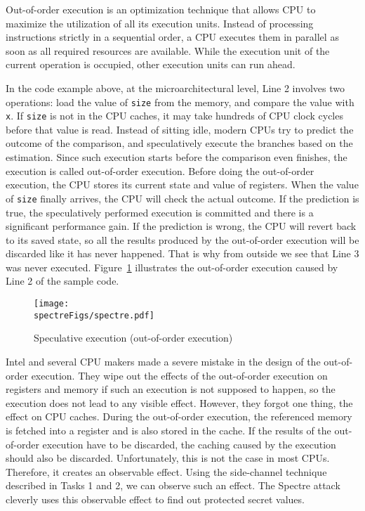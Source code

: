 Out-of-order execution is an optimization technique that allows CPU to maximize the utilization of
all its execution units. Instead of processing instructions
strictly in a sequential order, a CPU executes them in parallel
as soon as all required resources are available.
While the execution unit of the current operation is occupied, other
execution units can run ahead.

In the code example above, at the microarchitectural level, Line 2 involves
two operations: load the value of \texttt{size} from the memory, 
and compare the value with \texttt{x}. If \texttt{size} is not in the CPU
caches, it may take hundreds of CPU clock cycles before that value is read.
Instead of sitting idle, modern CPUs try to predict the outcome 
of the comparison, and speculatively execute the branches based on
the estimation. Since such execution starts before the comparison even finishes,
the execution is called out-of-order execution. 
Before doing the out-of-order execution,  
the CPU stores its current state and value of registers. 
When the value of \texttt{size} finally arrives, 
the CPU will check the actual outcome. If the prediction is true, the speculatively
performed execution is committed and there is a significant performance gain. If the prediction
is wrong, the CPU will revert back to its saved state, 
so all the results produced by the out-of-order execution will be discarded like
it has never happened.  That is why from outside we see that Line 3 was
never executed.
Figure~\ref{spectre:fig:spectre} illustrates the out-of-order execution
caused by Line 2 of the sample code.


\begin{figure}[htb]
\centering
\texttt{[image: \\spectreFigs/spectre.pdf]}
\caption{Speculative execution (out-of-order execution)}
\label{spectre:fig:spectre}
\end{figure}


Intel and several CPU makers made a severe mistake in the design of the out-of-order execution.
They wipe out the effects of the out-of-order execution on registers and memory
if such an execution is not supposed to happen, so the execution does not lead to
any visible effect. However, they forgot one thing, the effect on CPU caches.
During the out-of-order execution, the referenced memory is fetched into a register and is
also stored in the cache. If the results of the out-of-order execution have to be discarded,
the caching caused by the execution should also be discarded. Unfortunately, this is
not the case in most CPUs. Therefore, it creates an observable effect.
Using the side-channel technique described in Tasks 1 and 2, we
can observe such an effect. The Spectre attack cleverly uses this
observable effect to find out protected secret values.



